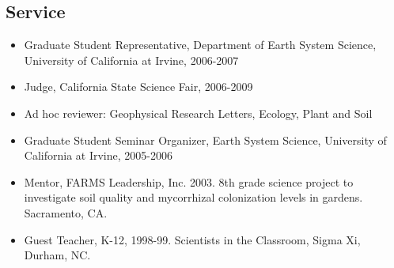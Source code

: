\documentclass[overlapped,line,letterpaper,10pt]{res}
\begin{document}
\begin{resume}
\vspace{-0.25cm}
\section{Service}
\begin{itemize}
\item Graduate Student Representative, Department of Earth System Science, University of California at Irvine, 2006-2007
\item Judge, California State Science Fair, 2006-2009
\item Ad hoc reviewer: Geophysical Research Letters, Ecology, Plant and Soil
\item Graduate Student Seminar Organizer, Earth System Science, University of California at Irvine, 2005-2006
\item Mentor, FARMS Leadership, Inc. 2003. 8th grade science project to investigate soil quality and mycorrhizal colonization levels in gardens. Sacramento, CA.
\item Guest Teacher, K-12, 1998-99. Scientists 
in the Classroom, Sigma Xi, Durham, NC.
\end{itemize}
\end{resume}
\end{document}
